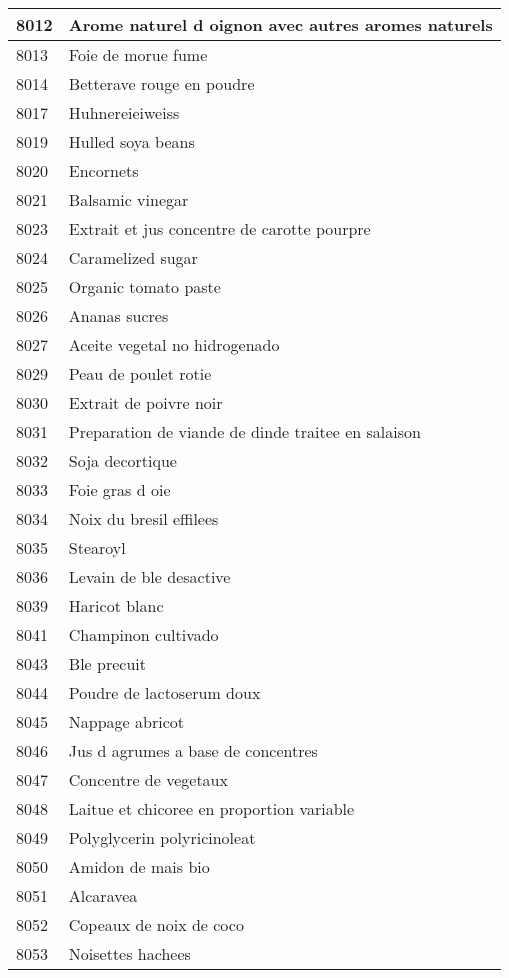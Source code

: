 \begin{longtable}{|l|l|}
8012 & Arome naturel d oignon avec autres aromes naturels \\ \hline 
8013 & Foie de morue fume \\ \hline 
8014 & Betterave rouge en poudre \\ \hline 
8017 & Huhnereieiweiss \\ \hline 
8019 & Hulled soya beans \\ \hline 
8020 & Encornets \\ \hline 
8021 & Balsamic vinegar \\ \hline 
8023 & Extrait et jus concentre de carotte pourpre \\ \hline 
8024 & Caramelized sugar \\ \hline 
8025 & Organic tomato paste \\ \hline 
8026 & Ananas sucres \\ \hline 
8027 & Aceite vegetal no hidrogenado \\ \hline 
8029 & Peau de poulet rotie \\ \hline 
8030 & Extrait de poivre noir \\ \hline 
8031 & Preparation de viande de dinde traitee en salaison \\ \hline 
8032 & Soja decortique \\ \hline 
8033 & Foie gras d oie \\ \hline 
8034 & Noix du bresil effilees \\ \hline 
8035 & Stearoyl \\ \hline 
8036 & Levain de ble desactive \\ \hline 
8039 & Haricot blanc \\ \hline 
8041 & Champinon cultivado \\ \hline 
8043 & Ble precuit \\ \hline 
8044 & Poudre de lactoserum doux \\ \hline 
8045 & Nappage abricot \\ \hline 
8046 & Jus d agrumes a base de concentres \\ \hline 
8047 & Concentre de vegetaux \\ \hline 
8048 & Laitue et chicoree en proportion variable \\ \hline 
8049 & Polyglycerin polyricinoleat \\ \hline 
8050 & Amidon de mais bio \\ \hline 
8051 & Alcaravea \\ \hline 
8052 & Copeaux de noix de coco \\ \hline 
8053 & Noisettes hachees \\ \hline 

\end{longtable}

